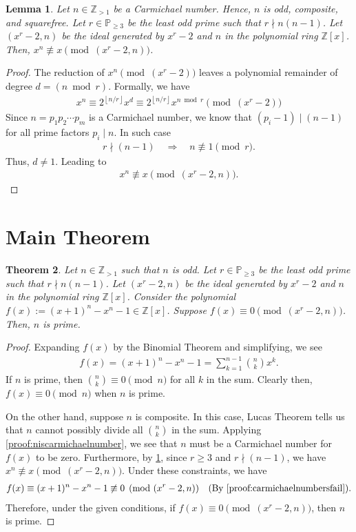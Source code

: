 \documentclass{article}
\theoremstyle{plain}
\newtheorem{theorem}{Theorem}
\newtheorem{lemma}[theorem]{Lemma}
\theoremstyle{definition}
\newcommand{\floor}[1]{\left\lfloor #1 \right\rfloor}
\newcommand{\Z}{\mathbb{Z}}
\begin{document}
\begin{lemma} \label{proof:carmichalenumberxnnotequalsx}
Let $n \in \Z_{>1}$ be a Carmichael number. Hence, $n$ is odd, composite, and squarefree. Let $r \in \mathbb{P}_{\geq 3}$ be the least odd prime such that $r \nmid n (n-1)$. Let $(x^r-2, n)$ be the ideal generated by $x^r-2$ and $n$ in the polynomial ring $\Z[x]$. Then, $x^n \not\equiv x \pmod{(x^r-2,n)}$.
\end{lemma}
\begin{proof}
The reduction of $x^n \pmod{(x^r-2)}$ leaves a polynomial remainder of degree $d = (n \bmod r)$. Formally, we have
\begin{align*}
    x^n \equiv 2^{\floor{n/r}} x^d \equiv 2^{\floor{n/r}} x^{n \bmod r} \pmod{(x^r-2)}
\end{align*}
Since $n = p_1 p_2 \cdots p_m$ is a Carmichael number, we know that $(p_i-1) \mid (n-1)$ for all prime factors $p_i \mid n$. In such case
\begin{align*}
    r \nmid (n-1) \quad \Longrightarrow \quad n \not\equiv 1 \pmod{r} . 
\end{align*}
Thus, $d \not= 1$. Leading to
\begin{align*}
    x^n \not\equiv x \pmod{(x^r-2, n)} .
\end{align*}
\end{proof}

\section{Main Theorem} \label{section:maintheorem}
\begin{theorem} \label{proof:main}
Let $n \in \Z_{>1}$ such that $n$ is odd. Let $r \in \mathbb{P}_{\geq 3}$ be the least odd prime such that $r \nmid n (n-1)$. Let $(x^r-2, n)$ be the ideal generated by $x^r-2$ and $n$ in the polynomial ring $\Z[x]$. Consider the polynomial $f(x) := (x+1)^n - x^n - 1 \in \Z[x]$. Suppose $f(x) \equiv 0 \pmod{(x^r-2, n)}$. Then, $n$ is prime.
\end{theorem}
\begin{proof}
Expanding $f(x)$ by the Binomial Theorem and simplifying, we see
\begin{align*}
    f(x) = (x+1)^n - x^n - 1 = \sum_{k=1}^{n-1} \binom{n}{k} x^k .
\end{align*}
If $n$ is prime, then $\binom{n}{k} \equiv 0 \pmod{n}$ for all $k$ in the sum. Clearly then, $f(x) \equiv 0 \pmod{n}$ when $n$ is prime.

On the other hand, suppose $n$ is composite. In this case, Lucas Theorem tells us that $n$ cannot possibly divide all $\binom{n}{k}$ in the sum. Applying \cref{proof:niscarmichaelnumber}, we see that $n$ must be a Carmichael number for $f(x)$ to be zero. Furthermore,  by \cref{proof:carmichalenumberxnnotequalsx}, since $r \geq 3$ and $r \nmid (n-1)$, we have $x^n \not\equiv x \pmod{(x^r-2,n)}$. Under these constraints, we have
\begin{align*}
    f(x) \equiv (x+1)^n - x^n - 1 \not\equiv 0 \pmod{(x^r-2, n)} \quad \text{(By \cref{proof:carmichaelnumbersfail})} .
\end{align*}
Therefore, under the given conditions, if $f(x) \equiv 0 \pmod{(x^r-2, n)}$, then $n$ is prime.
\end{proof}
\end{document}
